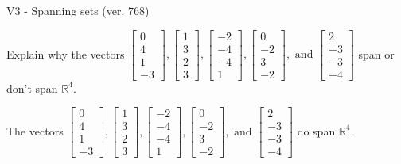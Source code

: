 \begin{exercise}
  \begin{exerciseTitle}V3 - Spanning sets (ver. 768)\end{exerciseTitle}
  \begin{exerciseStatement}
    Explain why the vectors \(\left[\begin{array}{r}
0 \\
4 \\
1 \\
-3
\end{array}\right] , \left[\begin{array}{r}
1 \\
3 \\
2 \\
3
\end{array}\right] , \left[\begin{array}{r}
-2 \\
-4 \\
-4 \\
1
\end{array}\right] , \left[\begin{array}{r}
0 \\
-2 \\
3 \\
-2
\end{array}\right] , \text{ and } \left[\begin{array}{r}
2 \\
-3 \\
-3 \\
-4
\end{array}\right]\) span or don't span \(\mathbb{R}^4\). 
	


  \end{exerciseStatement}
  \begin{exerciseAnswer}
   The vectors \(\left[\begin{array}{r}
0 \\
4 \\
1 \\
-3
\end{array}\right] , \left[\begin{array}{r}
1 \\
3 \\
2 \\
3
\end{array}\right] , \left[\begin{array}{r}
-2 \\
-4 \\
-4 \\
1
\end{array}\right] , \left[\begin{array}{r}
0 \\
-2 \\
3 \\
-2
\end{array}\right] , \text{ and } \left[\begin{array}{r}
2 \\
-3 \\
-3 \\
-4
\end{array}\right]\) 
  	 do  
	span \(\mathbb{R}^4\).
  



\end{exerciseAnswer}
\end{exercise}
